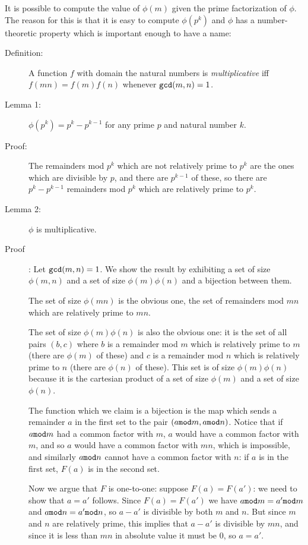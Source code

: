 \documentclass[12pt]{article}
\begin{document}
It is possible to compute the value of $\phi(m)$ given the prime factorization of $\phi$.   The reason for this is that it is easy to compute $\phi(p^k)$ and $\phi$ has a number-theoretic property which is important enough to have a name:

\begin{description}

\item[Definition:]   A function $f$ with domain the natural numbers is {\em multiplicative\/} iff $f(mn)=f(m)f(n)$ whenever ${\tt gcd}(m,n)=1$.

\item[Lemma 1:]   $\phi(p^k)= p^k-p^{k-1}$ for any prime $p$ and natural number $k$.

\item[Proof:]   The remainders mod $p^k$ which are not relatively prime to $p^k$ are the ones which are divisible by $p$, and there are $p^{k-1}$ of these, so there
are $p^k-p^{k-1}$ remainders mod $p^k$ which are relatively prime to $p^k$.

\item[Lemma 2:]  $\phi$ is multiplicative.

\item[Proof]:   Let ${\tt gcd}(m,n)=1$.   We show the result by exhibiting a set of size $\phi(m,n)$ and a set of size $\phi(m)\phi(n)$ and a bijection between them.

The set of size $\phi(mn)$ is the obvious one, the set of remainders mod $mn$ which are relatively prime to $mn$.

The set of size $\phi(m)\phi(n)$ is also the obvious one:  it is the set of all pairs $(b,c)$ where $b$ is a remainder mod $m$ which is relatively prime to $m$ (there are $\phi(m)$ of these) and $c$ is a remainder mod $n$ which is relatively prime to $n$ (there are $\phi(n)$ of these).  This set is of size  $\phi(m)\phi(n)$ because it is the cartesian product of a set of size $\phi(m)$ and a set of size $\phi(n)$.

The function which we claim is a bijection is the map which sends a remainder $a$ in the first set to the pair $(a{\tt mod}m,a{\tt mod}n)$.   Notice that if $a{\tt mod}m$ had a common factor with $m$, $a$ would have a common factor with $m$, and so $a$ would have a common factor with $mn$, which is impossible, and similarly $a{\tt mod}n$ cannot have a common factor with $n$:  if $a$ is in the first set, $F(a)$ is in the second set.

Now we argue that $F$ is one-to-one:   suppose $F(a)=F(a')$:  we need to show that $a=a'$ follows.   Since $F(a)=F(a')$ we have $a{\tt mod}m=a'{\tt mod}m$ and $a{\tt mod}n=a'{\tt mod}n$, so $a-a'$ is divisible by both $m$ and $n$.
But since $m$ and $n$ are relatively prime, this implies that $a-a'$ is divisible by $mn$, and since it is less than $mn$ in absolute value it must be 0, so $a=a'$.


\end{description}
\end{document}
